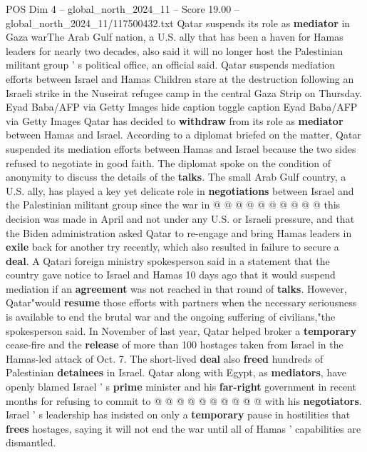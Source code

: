 \begin{textsample}{POS Dim 4 – global\_north\_2024\_11 – Score 19.00 – global\_north\_2024\_11/117500432.txt}  \label{ex:f4_pos_286}
Qatar suspends its role as \textbf{mediator} in Gaza warThe Arab Gulf nation, a U.S. ally that has been a haven for Hamas leaders for nearly two decades, also said it will no longer host the Palestinian militant group ' s political office, an official said.
Qatar suspends mediation efforts between Israel and Hamas Children stare at the destruction following an Israeli strike in the Nuseirat refugee camp in the central Gaza Strip on Thursday.
Eyad Baba/AFP via Getty Images hide caption toggle caption Eyad Baba/AFP via Getty Images Qatar has decided to \textbf{withdraw} from its role as \textbf{mediator} between Hamas and Israel.
According to a diplomat briefed on the matter, Qatar suspended its mediation efforts between Hamas and Israel because the two sides refused to negotiate in good faith.
The diplomat spoke on the condition of anonymity to discuss the details of the \textbf{talks}.
The small Arab Gulf country, a U.S. ally, has played a key yet delicate role in \textbf{negotiations} between Israel and the Palestinian militant group since the war in @ @ @ @ @ @ @ @ @ @ this decision was made in April and not under any U.S. or Israeli pressure, and that the Biden administration asked Qatar to re-engage and bring Hamas leaders in \textbf{exile} back for another try recently, which also resulted in failure to secure a \textbf{deal}.
A Qatari foreign ministry spokesperson said in a statement that the country gave notice to Israel and Hamas 10 days ago that it would suspend mediation if an \textbf{agreement} was not reached in that round of \textbf{talks}.
However, Qatar"would \textbf{resume} those efforts with partners when the necessary seriousness is available to end the brutal war and the ongoing suffering of civilians,"the spokesperson said.
In November of last year, Qatar helped broker a \textbf{temporary} cease-fire and the \textbf{release} of more than 100 hostages taken from Israel in the Hamas-led attack of Oct. 7.
The short-lived \textbf{deal} also \textbf{freed} hundreds of Palestinian \textbf{detainees} in Israel.
Qatar along with Egypt, as \textbf{mediators}, have openly blamed Israel ' s \textbf{prime} minister and his \textbf{far-right} government in recent months for refusing to commit to @ @ @ @ @ @ @ @ @ @ with his \textbf{negotiators}.
Israel ' s leadership has insisted on only a \textbf{temporary} pause in hostilities that \textbf{frees} hostages, saying it will not end the war until all of Hamas ' capabilities are dismantled.

\end{textsample}
